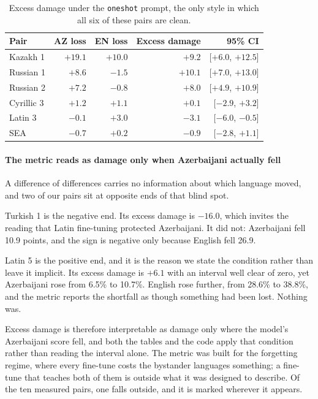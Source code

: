 \documentclass[final]{clv2025}
\begin{document}
\begin{table}[h!]
\caption{Excess damage under the \texttt{oneshot} prompt, the only style in
which all six of these pairs are clean.}
\label{tab:excess-oneshot}
\centering
\begin{tabular}{lrrrr}
\toprule
Pair & AZ loss & EN loss & Excess damage & 95\% CI \\
\midrule
Kazakh 1 & $+19.1$ & $+10.0$ & $\mathbf{+9.2}$ & [$+6.0$, $+12.5$] \\
Russian 1 & $+8.6$ & $-1.5$ & $\mathbf{+10.1}$ & [$+7.0$, $+13.0$] \\
Russian 2 & $+7.2$ & $-0.8$ & $\mathbf{+8.0}$ & [$+4.9$, $+10.9$] \\
Cyrillic 3 & $+1.2$ & $+1.1$ & $+0.1$ & [$-2.9$, $+3.2$] \\
Latin 3 & $-0.1$ & $+3.0$ & $-3.1$ & [$-6.0$, $-0.5$] \\
SEA & $-0.7$ & $+0.2$ & $-0.9$ & [$-2.8$, $+1.1$] \\
\bottomrule
\end{tabular}
\end{table}

\paragraph{The metric reads as damage only when Azerbaijani actually fell} A
difference of differences carries no information about which language moved,
and two of our pairs sit at opposite ends of that blind spot.

Turkish 1 is the negative end. Its excess damage is $-16.0$, which invites the
reading that Latin fine-tuning protected Azerbaijani. It did not: Azerbaijani
fell 10.9 points, and the sign is negative only because English fell 26.9.

Latin 5 is the positive end, and it is the reason we state the condition rather
than leave it implicit. Its excess damage is $+6.1$ with an interval well clear
of zero, yet Azerbaijani rose from 6.5\% to 10.7\%. English rose further, from
28.6\% to 38.8\%, and the metric reports the shortfall as though something had
been lost. Nothing was.

Excess damage is therefore interpretable as damage only where the model's
Azerbaijani score fell, and both the tables and the code apply that condition
rather than reading the interval alone. The metric was built for the forgetting
regime, where every fine-tune costs the bystander languages something; a
fine-tune that teaches both of them is outside what it was designed to
describe. Of the ten measured pairs, one falls outside, and it is marked
wherever it appears.
\end{document}
